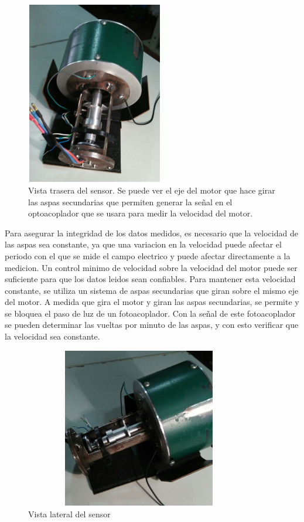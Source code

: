 \documentclass[a4paper]{article}
\begin{document}
\begin{figure}[H]
\centering
\includegraphics[width=6cm, height = 8cm]{sensor_2}
\caption{\small Vista trasera del sensor. Se puede ver el eje del motor que hace girar las aspas secundarias que permiten generar la señal en el optoacoplador que se usara para medir la velocidad del motor.}
\label{fig:sensor_2}
\end{figure}

Para asegurar la integridad de los datos medidos, es necesario que la velocidad de las aspas sea constante, ya que una variacion en la velocidad puede afectar el periodo con el que se mide el campo electrico y puede afectar directamente a la medicion. Un control minimo de velocidad sobre la velocidad del motor puede ser suficiente para que los datos leidos sean confiables. Para mantener esta velocidad constante, se utiliza un sistema de aspas secundarias que giran sobre el mismo eje del motor. A medida que gira el motor y giran las aspas secundarias, se permite y se bloquea el paso de luz de un fotoacoplador. Con la señal de este fotoacoplador se pueden determinar las vueltas por minuto de las aspas, y con esto verificar que la velocidad sea constante.



\begin{figure}[H]
\centering
\includegraphics[width=10cm, height = 7cm]{sensor_3}
\caption{\small Vista lateral del sensor}
\label{fig:sensor_3}
\end{figure}
\end{document}
